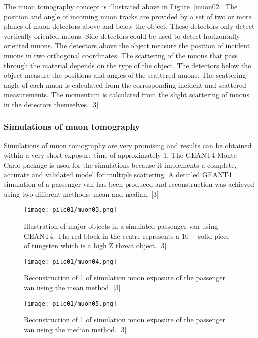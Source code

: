 \documentclass[twocolumn,a4paper]{article}
\begin{document}
The muon tomography concept is illustrated above in Figure~\ref{muon02}. The position and angle of incoming
muon tracks are provided by a set of two or more planes of muon detectors above and below the
object. These detectors only detect vertically oriented muons. Side detectors could be used to
detect horizontally oriented muons. The detectors above the object measure the position of incident
muons in two orthogonal coordinates. The scattering of the muons that pass through the material
depends on the type of the object. The detectors below the object measure the positions and angles
of the scattered muons. The scattering angle of each muon is calculated from the corresponding
incident and scattered measurements. The momentum is calculated from the slight scattering of
muons in the detectors themselves. [3]

\subsubsection{Simulations of muon tomography}
Simulations of muon tomography are very promising and results can be obtained within a very short
exposure time of approximately \unit{1}{\minute}. The GEANT4 Monte Carlo package is used for the simulations
because it implements a complete, accurate and validated model for multiple scattering. A detailed
GEANT4 simulation of a passenger van has been produced and reconstruction was achieved using
two different methods: mean and median. [3]

\begin{figure}
  \texttt{[image: pile01/muon03.png]}
  \caption{Illustration of major objects in a simulated passenger van using GEANT4. The red block in
the centre represents a \unit{10}{\cubic{\centi\metre}} solid piece of tungsten which is a high Z threat object. [3]}
\end{figure}
\begin{figure}
  \texttt{[image: pile01/muon04.png]}
  \caption{Reconstruction of \unit{1}{\minute} of simulation muon exposure of the passenger van using the
mean method. [3]}
  \label{muon04}
\end{figure}
\begin{figure}
  \texttt{[image: pile01/muon05.png]}
  \caption{Reconstruction of \unit{1}{\minute} of simulation muon exposure of the passenger van using the
median method. [3]}
  \label{muon05}
\end{figure}
\end{document}
